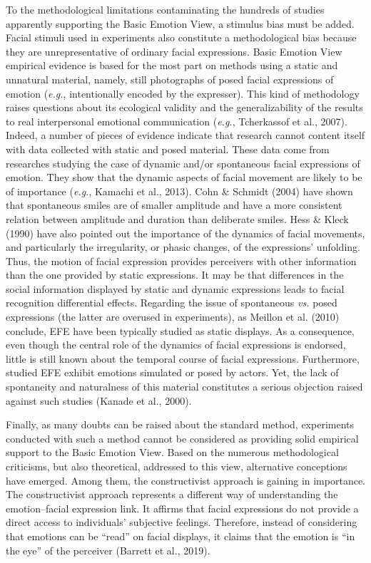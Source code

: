\documentclass[
  english,
  man]{apa7}
\begin{document}
To the methodological limitations contaminating the hundreds of studies apparently supporting the Basic Emotion View, a stimulus bias must be added. Facial stimuli used in experiments also constitute a methodological bias because they are unrepresentative of ordinary facial expressions. Basic Emotion View empirical evidence is based for the most part on methods using a static and unnatural material, namely, still photographs of posed facial expressions of emotion (\emph{e.g.}, intentionally encoded by the expresser). This kind of methodology raises questions about its ecological validity and the generalizability of the results to real interpersonal emotional communication (\emph{e.g.}, Tcherkassof et al., 2007). Indeed, a number of pieces of evidence indicate that research cannot content itself with data collected with static and posed material. These data come from researches studying the case of dynamic and/or spontaneous facial expressions of emotion. They show that the dynamic aspects of facial movement are likely to be of importance (\emph{e.g.}, Kamachi et al., 2013). Cohn \& Schmidt (2004) have shown that spontaneous smiles are of smaller amplitude and have a more consistent relation between amplitude and duration than deliberate smiles. Hess \& Kleck (1990) have also pointed out the importance of the dynamics of facial movements, and particularly the irregularity, or phasic changes, of the expressions' unfolding. Thus, the motion of facial expression provides perceivers with other information than the one provided by static expressions. It may be that differences in the social information displayed by static and dynamic expressions leads to facial recognition differential effects. Regarding the issue of spontaneous \emph{vs.} posed expressions (the latter are overused in experiments), as Meillon et al. (2010) conclude, EFE have been typically studied as static displays. As a consequence, even though the central role of the dynamics of facial expressions is endorsed, little is still known about the temporal course of facial expressions. Furthermore, studied EFE exhibit emotions simulated or posed by actors. Yet, the lack of spontaneity and naturalness of this material constitutes a serious objection raised against such studies (Kanade et al., 2000).

Finally, as many doubts can be raised about the standard method, experiments conducted with such a method cannot be considered as providing solid empirical support to the Basic Emotion View. Based on the numerous methodological criticisms, but also theoretical, addressed to this view, alternative conceptions have emerged. Among them, the constructivist approach is gaining in importance. The constructivist approach represents a different way of understanding the emotion--facial expression link. It affirms that facial expressions do not provide a direct access to individuals' subjective feelings. Therefore, instead of considering that emotions can be ``read'' on facial displays, it claims that the emotion is ``in the eye'' of the perceiver (Barrett et al., 2019).
\end{document}
